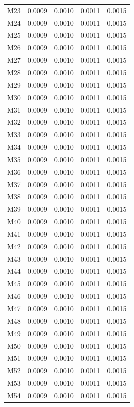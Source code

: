 \begin{longtable}{lrrrr}
M23 & 0.0009 & 0.0010 & 0.0011 & 0.0015 \\
M24 & 0.0009 & 0.0010 & 0.0011 & 0.0015 \\
M25 & 0.0009 & 0.0010 & 0.0011 & 0.0015 \\
M26 & 0.0009 & 0.0010 & 0.0011 & 0.0015 \\
M27 & 0.0009 & 0.0010 & 0.0011 & 0.0015 \\
M28 & 0.0009 & 0.0010 & 0.0011 & 0.0015 \\
M29 & 0.0009 & 0.0010 & 0.0011 & 0.0015 \\
M30 & 0.0009 & 0.0010 & 0.0011 & 0.0015 \\
M31 & 0.0009 & 0.0010 & 0.0011 & 0.0015 \\
M32 & 0.0009 & 0.0010 & 0.0011 & 0.0015 \\
M33 & 0.0009 & 0.0010 & 0.0011 & 0.0015 \\
M34 & 0.0009 & 0.0010 & 0.0011 & 0.0015 \\
M35 & 0.0009 & 0.0010 & 0.0011 & 0.0015 \\
M36 & 0.0009 & 0.0010 & 0.0011 & 0.0015 \\
M37 & 0.0009 & 0.0010 & 0.0011 & 0.0015 \\
M38 & 0.0009 & 0.0010 & 0.0011 & 0.0015 \\
M39 & 0.0009 & 0.0010 & 0.0011 & 0.0015 \\
M40 & 0.0009 & 0.0010 & 0.0011 & 0.0015 \\
M41 & 0.0009 & 0.0010 & 0.0011 & 0.0015 \\
M42 & 0.0009 & 0.0010 & 0.0011 & 0.0015 \\
M43 & 0.0009 & 0.0010 & 0.0011 & 0.0015 \\
M44 & 0.0009 & 0.0010 & 0.0011 & 0.0015 \\
M45 & 0.0009 & 0.0010 & 0.0011 & 0.0015 \\
M46 & 0.0009 & 0.0010 & 0.0011 & 0.0015 \\
M47 & 0.0009 & 0.0010 & 0.0011 & 0.0015 \\
M48 & 0.0009 & 0.0010 & 0.0011 & 0.0015 \\
M49 & 0.0009 & 0.0010 & 0.0011 & 0.0015 \\
M50 & 0.0009 & 0.0010 & 0.0011 & 0.0015 \\
M51 & 0.0009 & 0.0010 & 0.0011 & 0.0015 \\
M52 & 0.0009 & 0.0010 & 0.0011 & 0.0015 \\
M53 & 0.0009 & 0.0010 & 0.0011 & 0.0015 \\
M54 & 0.0009 & 0.0010 & 0.0011 & 0.0015 \\

\end{longtable}
